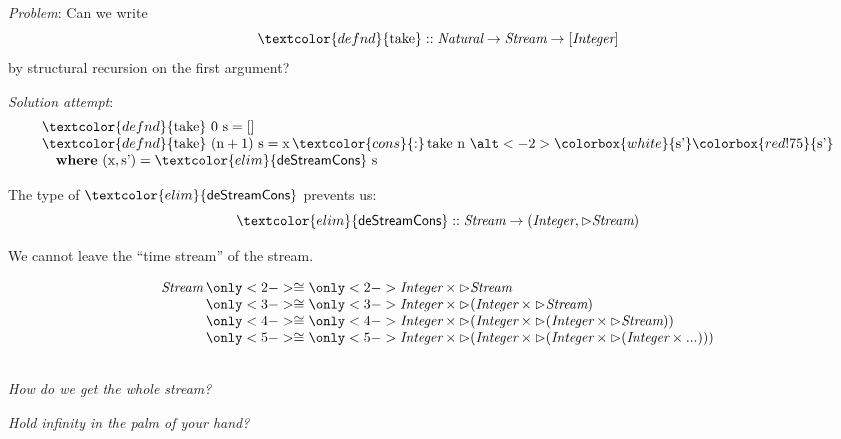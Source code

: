 \documentclass[xetex,serif,mathserif]{beamer}
\newenvironment{slide}[1]{\begin{frame}\frametitle{#1}}{\end{frame}}
\newcommand{\cons}[1]{\textcolor{cons}{\textsf{#1}}}
\newcommand{\elim}[1]{\textcolor{elim}{\textsf{#1}}}
\newcommand{\kw}[1]{\textbf{#1}}
\newcommand{\tyname}[1]{\textit{#1}}
\newcommand{\ident}[1]{\textrm{#1}}
\newcommand{\defn}[1]{\textcolor{defnd}{\textrm{#1}}}
\begin{document}
\begin{slide}{}

  \textcolor{titlered}{\emph{Problem}}:
  Can we write
  \begin{displaymath}
    \defn{take} :: \tyname{Natural} \to \tyname{Stream} \to [\tyname{Integer}]
  \end{displaymath}
  by structural recursion on the first argument?

  \bigskip
  \pause
  \textcolor{titlered}{\emph{Solution attempt}}:
  \begin{displaymath}
    \begin{array}{l}
      \defn{take}\ 0\ \ident{s} = [] \\
      \defn{take}\ (\ident{n}+1)\ \ident{s} = \ident{x} \mathop{\cons{:}} \ident{take}\ \ident{n}\ \alt<-2>{\colorbox{white}{\ident{s’}}}{\colorbox{red!75}{\ident{s’}}} \\
      \quad \kw{where}\ (\ident{x}, \ident{s’}) = \elim{deStreamCons}\ \ident{s}
    \end{array}
  \end{displaymath}
  \pause

  The type of $\elim{deStreamCons}$ prevents us:
  \begin{displaymath}
    \elim{deStreamCons} :: \tyname{Stream} \to (\tyname{Integer}, \rhd\tyname{Stream})    
  \end{displaymath}

  We cannot leave the “time stream” of the stream.
\end{slide}

\begin{frame}
  \begin{displaymath}
    \begin{array}{l@{\hspace{0.2em}}c@{\hspace{0.3em}}l}
      \tyname{Stream} &\only<2->\cong& \only<2->{\tyname{Integer} \times \rhd\tyname{Stream}} \\
      & \only<3->\cong & \only<3->{\tyname{Integer} \times \rhd(\tyname{Integer} \times \rhd\tyname{Stream})} \\
      & \only<4->\cong & \only<4->{\tyname{Integer} \times \rhd(\tyname{Integer} \times \rhd(\tyname{Integer} \times \rhd\tyname{Stream}))} \\
      & \only<5->\cong & \only<5->{\tyname{Integer} \times \rhd(\tyname{Integer} \times \rhd(\tyname{Integer} \times \rhd(\tyname{Integer} \times ...)))} \\
      & & \hspace{10cm}
    \end{array}
  \end{displaymath}

  \pause
  \pause
  \pause
  \pause
  \pause
  \bigskip

  \begin{center}
    \emph{How do we get the whole stream?}
  \end{center}

  \pause
  \begin{center}
    \emph{Hold infinity in the palm of your hand?}
  \end{center}
\end{frame}
\end{document}
